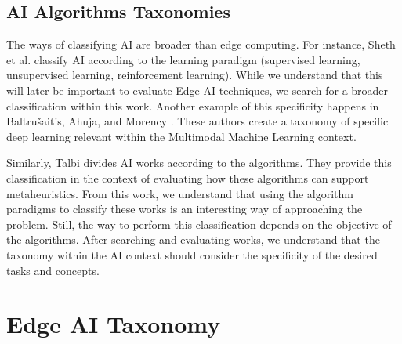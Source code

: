 \subsection{AI Algorithms Taxonomies}

The ways of classifying AI are broader than edge computing. For instance, Sheth et al. \cite{sheth2020taxonomy} classify AI according to the learning paradigm (supervised learning, unsupervised learning, reinforcement learning). While we understand that this will later be important to evaluate Edge AI techniques, we search for a broader classification within this work. Another example of this specificity happens in Baltru{\v{s}}aitis, Ahuja, and Morency \cite{baltruvsaitis2018multimodal}. These authors create a taxonomy of specific deep learning relevant within the Multimodal Machine Learning context.

Similarly, Talbi \cite{talbi2021machine} divides AI works according to the algorithms. They provide this classification in the context of evaluating how these algorithms can support metaheuristics. From this work, we understand that using the algorithm paradigms to classify these works is an interesting way of approaching the problem. Still, the way to perform this classification depends on the objective of the algorithms. After searching and evaluating works, we understand that the taxonomy within the AI context should consider the specificity of the desired tasks and concepts. 

\section{Edge AI Taxonomy}
\label{sec:taxonomy}

